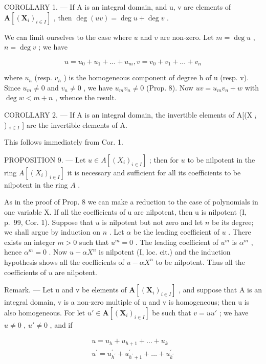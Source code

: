 COROLLARY 1. --- If A is an integral domain, and u, v are elements of \(\mathbf{A}[(\mathbf{X}_{i})_{i\in I}]\) , then \(\deg(uv)=\deg u+\deg v\) .

We can limit ourselves to the case where \(u\) and \(v\) are non-zero. Let \(m = \deg u\) , \(n = \deg v\) ; we have

\[
u = u _ {0} + u _ {1} + \dots + u _ {m}, v = v _ {0} + v _ {1} + \dots + v _ {n}
\]

where \(u_{h}\) (resp. \(v_{h}\) ) is the homogeneous component of degree h of u (resp. v). Since \(u_{m} \neq 0\) and \(v_{n} \neq 0\) , we have \(u_{m}v_{n} \neq 0\) (Prop. 8). Now \(uv = u_{m}v_{n} + w\) with \(\deg w < m + n\) , whence the result.

COROLLARY 2. --- If A is an integral domain, the invertible elements of A{[}(X \(_{i}\) ) \(_{i \in I}\) {]} are the invertible elements of A.

This follows immediately from Cor. 1.

PROPOSITION 9. --- Let \(u \in A[(X_i)_{i \in I}]\) ; then for \(u\) to be nilpotent in the ring \(A[(X_i)_{i \in I}]\) it is necessary and sufficient for all its coefficients to be nilpotent in the ring \(A\) .

As in the proof of Prop. 8 we can make a reduction to the case of polynomials in one variable X. If all the coefficients of u are nilpotent, then u is nilpotent (I, p.~99, Cor. 1). Suppose that \(u\) is nilpotent but not zero and let \(n\) be its degree; we shall argue by induction on \(n\) . Let \(\alpha\) be the leading coefficient of \(u\) . There exists an integer \(m > 0\) such that \(u^m = 0\) . The leading coefficient of \(u^m\) is \(\alpha^m\) , hence \(\alpha^m = 0\) . Now \(u - \alpha X^n\) is nilpotent (I, loc. cit.) and the induction hypothesis shows all the coefficients of \(u - \alpha X^n\) to be nilpotent. Thus all the coefficients of \(u\) are nilpotent.

Remark. --- Let u and v be elements of \(\mathbf{A}[(\mathbf{X}_{i})_{i\in I}]\) , and suppose that A is an integral domain, v is a non-zero multiple of u and v is homogeneous; then u is also homogeneous. For let \(u'\in\mathbf{A}[(\mathbf{X}_{i})_{i\in I}]\) be such that \(v=uu'\) ; we have \(u\neq0\) , \(u'\neq0\) , and if

\[
\begin{array}{c} u = u _ {h} + u _ {h + 1} + \dots + u _ {k} \\ u ^ {\prime} = u _ {h ^ {\prime}} ^ {\prime} + u _ {h ^ {\prime} + 1} ^ {\prime} + \dots + u _ {k ^ {\prime}} ^ {\prime} \end{array}
\]

